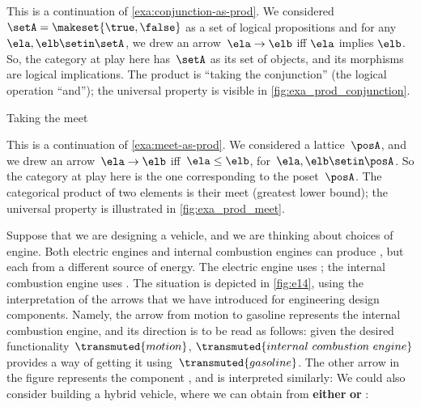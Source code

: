 \begin{example}
    \label{exa:conjunction-as-prod-cont}
    This is a continuation of \cref{exa:conjunction-as-prod}.
    We considered~$\setA = \makeset{ \true, \false }$ as a set of logical propositions and for any~$\ela, \elb  \setin \setA$, we drew an arrow~$\ela \to \elb$ iff $\ela$ implies $\elb$.
    So, the category at play here has~$\setA$ as its set of objects, and its morphisms are logical implications.
    The product is ``taking the conjunction'' (the logical operation ``and''); the universal property is visible in \cref{fig:exa_prod_conjunction}.

\end{example}

\begin{marginfigure}
    \centering
    \caption{Taking the meet}
    \label{fig:exa_prod_meet_cont}
\end{marginfigure}

\begin{example}
    \label{exa:meet-as-prod-cont}
    This is a continuation of \cref{exa:meet-as-prod}.
    We considered a lattice~$\posA$, and we drew an arrow~$\ela \to \elb$ iff~$\ela \leq \elb$, for~$\ela,\elb\setin \posA$.
    So the category at play here is the one corresponding to the poset~$\posA$.
    The categorical product of two elements is their meet (greatest lower bound); the universal property is illustrated in \cref{fig:exa_prod_meet}.
\end{example}

\begin{example}
    Suppose that we are designing a vehicle, and we are thinking about choices of engine.
    Both electric engines and internal combustion engines can produce , but each from a different source of energy.
    The electric engine uses ; the internal combustion engine uses .
    The situation is depicted in \cref{fig:e14}, using the interpretation of the arrows that we have introduced for engineering design components.
    Namely, the arrow from motion to gasoline represents the internal combustion engine, and its direction is to be read as follows: given the desired functionality~$\transmuted{motion}$, $\transmuted{internal \ combustion \ engine}$ provides a way of getting it using~$\transmuted{gasoline}$.
    The other arrow in the figure represents the component , and is interpreted similarly:
    We could also consider building a hybrid vehicle, where we can obtain  from \textbf{either}  \textbf{or} :
\end{example}

